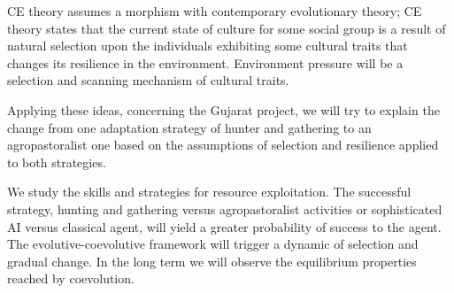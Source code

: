 \documentclass[11pt,oneside,a4paper,openright]{report}
\begin{document}
CE theory assumes a morphism with contemporary evolutionary theory; CE theory states that the current state of culture for some social group is a result of natural selection upon the individuals exhibiting some cultural traits that changes its resilience in the environment. Environment pressure will be a selection and scanning mechanism of cultural traits.

Applying these ideas, concerning the Gujarat project, we will try to explain the change from one adaptation strategy of hunter and gathering to an agropastoralist one based on the assumptions of selection and resilience applied to both strategies. 



We study the skills and strategies for resource exploitation. The successful strategy, hunting and gathering versus agropastoralist activities or sophisticated AI versus classical agent, will yield a greater probability of success to the agent. The evolutive-coevolutive framework will trigger a dynamic of selection and gradual change. In the long term we will observe the equilibrium properties reached by coevolution. 

\end{document}
